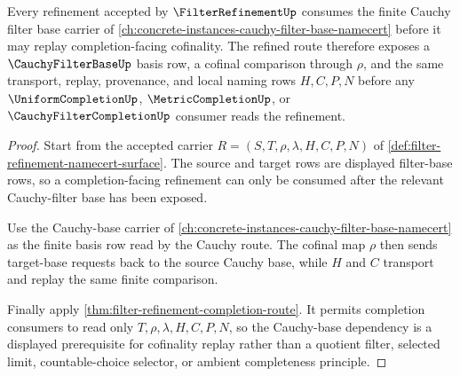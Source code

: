 \begin{theorem}
\label{thm:filter-refinement-cauchy-base-dependency}
Every refinement accepted by $\FilterRefinementUp$ consumes the finite Cauchy filter base carrier of \autoref{ch:concrete-instances-cauchy-filter-base-namecert} before it may replay completion-facing cofinality. The refined route therefore exposes a $\CauchyFilterBaseUp$ basis row, a cofinal comparison through $\rho$, and the same transport, replay, provenance, and local naming rows $H,C,P,N$ before any $\UniformCompletionUp$, $\MetricCompletionUp$, or $\CauchyFilterCompletionUp$ consumer reads the refinement.
\end{theorem}
\begin{proof}
Start from the accepted carrier $R=(S,T,\rho,\lambda,H,C,P,N)$ of \autoref{def:filter-refinement-namecert-surface}. The source and target rows are displayed filter-base rows, so a completion-facing refinement can only be consumed after the relevant Cauchy-filter base has been exposed.

Use the Cauchy-base carrier of \autoref{ch:concrete-instances-cauchy-filter-base-namecert} as the finite basis row read by the Cauchy route. The cofinal map $\rho$ then sends target-base requests back to the source Cauchy base, while $H$ and $C$ transport and replay the same finite comparison.

Finally apply \autoref{thm:filter-refinement-completion-route}. It permits completion consumers to read only $T,\rho,\lambda,H,C,P,N$, so the Cauchy-base dependency is a displayed prerequisite for cofinality replay rather than a quotient filter, selected limit, countable-choice selector, or ambient completeness principle.
\end{proof}

